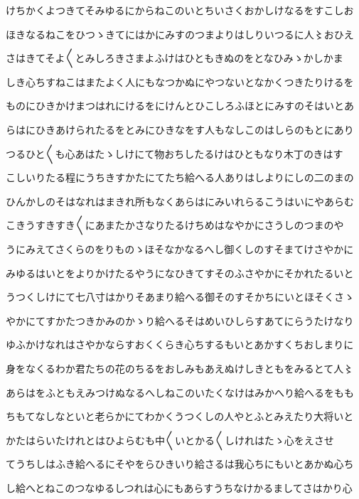\documentclass[a4paper,11pt,landscape]{ltjtarticle}
\begin{document}
\par\medskip
けちかくよつきてそみゆるにからねこのいとちいさくおかしけなるをすこしお
\par\medskip
ほきなるねこをひつゝきてにはかにみすのつまよりはしりいつるに人〻おひえ
\par\medskip
さはきてそよ〱とみしろきさまよふけはひともきぬのをとなひみゝかしかま
\par\medskip
しき心ちすねこはまたよく人にもなつかぬにやつないとなかくつきたりけるを
\par\medskip
ものにひきかけまつはれにけるをにけんとひこしろふほとにみすのそはいとあ
\par\medskip
らはにひきあけられたるをとみにひきなをす人もなしこのはしらのもとにあり
\par\medskip
つるひと〱も心あはたゝしけにて物おちしたるけはひともなり木丁のきはす
\par\medskip
こしいりたる程にうちきすかたにてたち給へる人ありはしよりにしの二のまの
\par\medskip
ひんかしのそはなれはまきれ所もなくあらはにみいれらるこうはいにやあらむ
\par\medskip
こきうすきすき〱にあまたかさなりたるけちめはなやかにさうしのつまのや
\par\medskip
うにみえてさくらのをりものゝほそなかなるへし御くしのすそまてけさやかに
\par\medskip
みゆるはいとをよりかけたるやうになひきてすそのふさやかにそかれたるいと
\par\medskip
うつくしけにて七八寸はかりそあまり給へる御そのすそかちにいとほそくさゝ
\par\medskip
やかにてすかたつきかみのかゝり給へるそはめいひしらすあてにらうたけなり
\par\medskip
ゆふかけなれはさやかならすおくくらき心ちするもいとあかすくちおしまりに
\par\medskip
身をなくるわか君たちの花のちるをおしみもあえぬけしきともをみるとて人〻
\par\medskip
あらはをふともえみつけぬなるへしねこのいたくなけはみかへり給へるをもも
\par\medskip
ちもてなしなといと老らかにてわかくうつくしの人やとふとみえたり大将いと
\par\medskip
かたはらいたけれとはひよらむも中〱いとかる〱しけれはたゝ心をえさせ
\par\medskip
てうちしはふき給へるにそやをらひきいり給さるは我心ちにもいとあかぬ心ち
\par\medskip
し給へとねこのつなゆるしつれは心にもあらすうちなけかるましてさはかり心
\par\medskip
\end{document}
